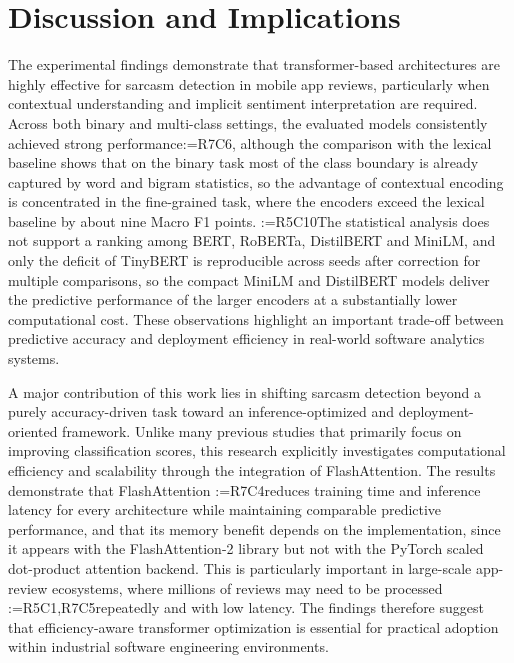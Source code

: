 \documentclass[a4paper,fleqn]{cas-sc}
\makeatletter
\newif\iftracked
\newcommand{\rv@setcolour}[1]{%
  \IfStrEq{#1}{R7C7}{\color{rvEdit}}{%
    \IfSubStr{#1}{R5}{\IfSubStr{#1}{R7}{\color{rvBoth}}{\color{rvFive}}}{\color{rvSeven}}}}
\newcommand{\rv@tag}[1]{\textsuperscript{\sffamily\bfseries\scriptsize[\StrSubstitute{#1}{,}{, }]}\,}
\newcommand{\rv@recordone}[1]{%
  \edef\rv@i{#1}%
  \ifcsdef{rv@n@\rv@i}{}{\csgdef{rv@n@\rv@i}{0}}%
  \csxdef{rv@n@\rv@i}{\the\numexpr\csuse{rv@n@\rv@i}+1\relax}%
  \begingroup\edef\@currentlabel{\rv@i}\label{rv:\rv@i:\csuse{rv@n@\rv@i}}\endgroup}
\newcommand{\rv@record}[1]{\@for\rv@id:=#1\do{\expandafter\rv@recordone\expandafter{\rv@id}}}
\DeclareRobustCommand{\rcrep}[3]{\rv@record{#1}\iftracked{\rv@setcolour{#1}\rv@tag{#1}\rv@strike{#2} #3}\else#3\fi}
\makeatother
\begin{document}
\section{Discussion and Implications}
\label{sec:discussion}
The experimental findings demonstrate that transformer-based architectures are highly effective for sarcasm detection in mobile app reviews, particularly when contextual understanding and implicit sentiment interpretation are required. Across both binary and multi-class settings, the evaluated models consistently achieved strong performance\rcrep{R7C6}{, confirming that self-attention mechanisms are capable of capturing the contrast between literal wording and intended meaning}{, although the comparison with the lexical baseline shows that on the binary task most of the class boundary is already captured by word and bigram statistics, so the advantage of contextual encoding is concentrated in the fine-grained task, where the encoders exceed the lexical baseline by about nine Macro F1 points}. \rcrep{R5C10}{In particular, RoBERTa and BERT showed superior performance due to their deeper contextual representation capabilities, while lightweight architectures such as TinyBERT and MiniLM provided competitive results with substantially lower computational cost.}{The statistical analysis does not support a ranking among BERT, RoBERTa, DistilBERT and MiniLM, and only the deficit of TinyBERT is reproducible across seeds after correction for multiple comparisons, so the compact MiniLM and DistilBERT models deliver the predictive performance of the larger encoders at a substantially lower computational cost.} These observations highlight an important trade-off between predictive accuracy and deployment efficiency in real-world software analytics systems.

A major contribution of this work lies in shifting sarcasm detection beyond a purely accuracy-driven task toward an inference-optimized and deployment-oriented framework. Unlike many previous studies that primarily focus on improving classification scores, this research explicitly investigates computational efficiency and scalability through the integration of FlashAttention. The results demonstrate that FlashAttention \rcrep{R7C4}{significantly reduces training time, inference latency, and memory overhead while maintaining comparable predictive performance across models}{reduces training time and inference latency for every architecture while maintaining comparable predictive performance, and that its memory benefit depends on the implementation, since it appears with the FlashAttention-2 library but not with the PyTorch scaled dot-product attention backend}. This is particularly important in large-scale app-review ecosystems, where millions of reviews may need to be processed \rcrep{R5C1,R7C5}{continuously and in near real time}{repeatedly and with low latency}. The findings therefore suggest that efficiency-aware transformer optimization is essential for practical adoption within industrial software engineering environments.
\end{document}
